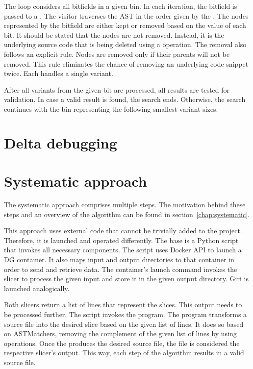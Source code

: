 The loop considers all bitfields in a given bin.
In each iteration, the bitfield is passed to 
a .
The visitor traverses the AST in the order given by 
the .
The nodes represented by the bitfield are either kept or removed based on 
the value of each bit.
It should be stated that the nodes are not removed.
Instead, it is the underlying source code that is being deleted using 
a  operation.
The removal also follows an explicit rule.
Nodes are removed only if their parents will not be removed.
This rule eliminates the chance of removing an underlying code snippet twice.
Each  handles a single variant.

After all variants from the given bit are processed, all results are tested 
for validation.
In case a valid result is found, the search ends.
Otherwise, the search continues with the bin representing the following 
smallest variant sizes.

\section{Delta debugging}

\section{Systematic approach}


The systematic approach comprises multiple steps.
The motivation behind these steps and an overview of the algorithm can be 
found in section~\ref{chap:systematic}.

This approach uses external code that cannot be trivially added to 
the project.
Therefore, it is launched and operated differently.
The base is a Python script that invokes all necessary components.
The script uses Docker API to launch a DG container.
It also maps input and output directories to that container in order to send 
and retrieve data.
The container's launch command invokes the slicer to process the given input 
and store it in the given output directory.
Giri is launched analogically.

Both slicers return a list of lines that represent the slices.
This output needs to be processed further.
The script invokes the  program.
The program transforms a source file into the desired slice based on 
the given list of lines.
It does so based on ASTMatchers, removing the complement of the given list 
of lines by using  operations.
Once the  produces the desired source file, the file 
is considered the respective slicer's output.
This way, each step of the algorithm results in a valid source file.

